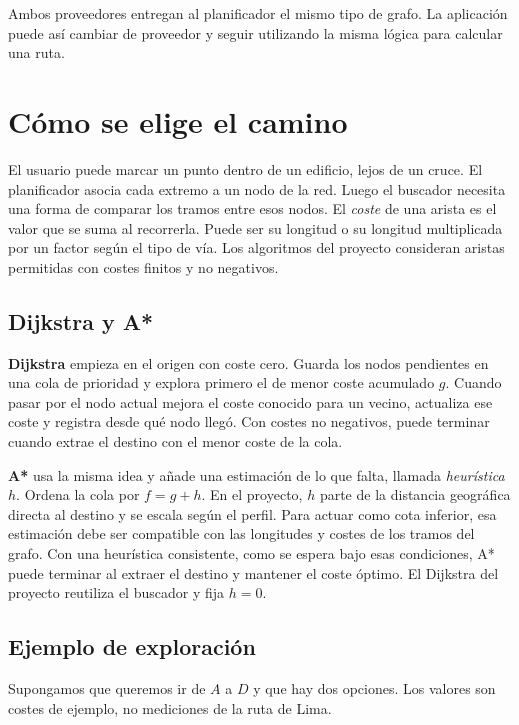 \documentclass[11pt,a4paper]{article}
\begin{document}
Ambos proveedores entregan al planificador el mismo tipo de grafo. La aplicación puede así cambiar de proveedor y seguir utilizando la misma lógica para calcular una ruta.

\clearpage
\section{Cómo se elige el camino}

El usuario puede marcar un punto dentro de un edificio, lejos de un cruce. El planificador asocia cada extremo a un nodo de la red. Luego el buscador necesita una forma de comparar los tramos entre esos nodos. El \emph{coste} de una arista es el valor que se suma al recorrerla. Puede ser su longitud o su longitud multiplicada por un factor según el tipo de vía. Los algoritmos del proyecto consideran aristas permitidas con costes finitos y no negativos.

\subsection{Dijkstra y A*}

\textbf{Dijkstra} empieza en el origen con coste cero. Guarda los nodos pendientes en una cola de prioridad y explora primero el de menor coste acumulado \(g\). Cuando pasar por el nodo actual mejora el coste conocido para un vecino, actualiza ese coste y registra desde qué nodo llegó. Con costes no negativos, puede terminar cuando extrae el destino con el menor coste de la cola.

\textbf{A*} usa la misma idea y añade una estimación de lo que falta, llamada \emph{heurística} \(h\). Ordena la cola por \(f=g+h\). En el proyecto, \(h\) parte de la distancia geográfica directa al destino y se escala según el perfil. Para actuar como cota inferior, esa estimación debe ser compatible con las longitudes y costes de los tramos del grafo. Con una heurística consistente, como se espera bajo esas condiciones, A* puede terminar al extraer el destino y mantener el coste óptimo. El Dijkstra del proyecto reutiliza el buscador y fija \(h=0\).

\subsection{Ejemplo de exploración}

Supongamos que queremos ir de \(A\) a \(D\) y que hay dos opciones. Los valores son costes de ejemplo, no mediciones de la ruta de Lima.
\end{document}
